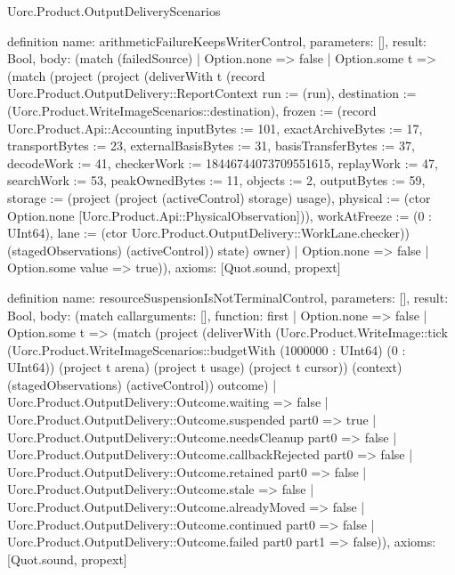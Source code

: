 \begin{lexlean}{Uorc.Product.OutputDeliveryScenarios}
\begin{semanticmodule}
definition{
  name: arithmeticFailureKeepsWriterControl,
  parameters: [],
  result: Bool,
  body: (match (failedSource)
    | Option.none => false
    | Option.some t => (match (project (project (deliverWith t (record Uorc.Product.OutputDelivery::ReportContext {run := (run), destination := (Uorc.Product.WriteImageScenarios::destination), frozen := (record Uorc.Product.Api::Accounting {inputBytes := 101, exactArchiveBytes := 17, transportBytes := 23, externalBasisBytes := 31, basisTransferBytes := 37, decodeWork := 41, checkerWork := 18446744073709551615, replayWork := 47, searchWork := 53, peakOwnedBytes := 11, objects := 2, outputBytes := 59, storage := (project (project (activeControl) storage) usage), physical := (ctor Option.none [Uorc.Product.Api::PhysicalObservation])}), workAtFreeze := (0 : UInt64), lane := (ctor Uorc.Product.OutputDelivery::WorkLane.checker)}) (stagedObservations) (activeControl)) state) owner)
      | Option.none => false
      | Option.some value => true)),
  axioms: [Quot.sound, propext]
}

definition{
  name: resourceSuspensionIsNotTerminalControl,
  parameters: [],
  result: Bool,
  body: (match call{arguments: [], function: first}
    | Option.none => false
    | Option.some t => (match (project (deliverWith (Uorc.Product.WriteImage::tick (Uorc.Product.WriteImageScenarios::budgetWith (1000000 : UInt64) (0 : UInt64)) (project t arena) (project t usage) (project t cursor)) (context) (stagedObservations) (activeControl)) outcome)
      | Uorc.Product.OutputDelivery::Outcome.waiting => false
      | Uorc.Product.OutputDelivery::Outcome.suspended part0 => true
      | Uorc.Product.OutputDelivery::Outcome.needsCleanup part0 => false
      | Uorc.Product.OutputDelivery::Outcome.callbackRejected part0 => false
      | Uorc.Product.OutputDelivery::Outcome.retained part0 => false
      | Uorc.Product.OutputDelivery::Outcome.stale => false
      | Uorc.Product.OutputDelivery::Outcome.alreadyMoved => false
      | Uorc.Product.OutputDelivery::Outcome.continued part0 => false
      | Uorc.Product.OutputDelivery::Outcome.failed part0 part1 => false)),
  axioms: [Quot.sound, propext]
}


\end{semanticmodule}
\end{lexlean}
